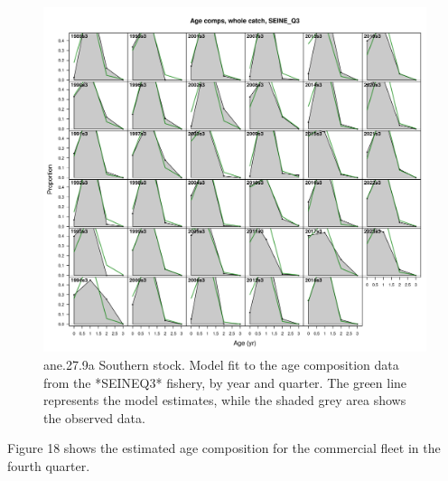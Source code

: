 \documentclass[
]{article}
\begin{document}
\begin{figure}[H]

{\centering \includegraphics[width=0.95\linewidth]{report/run/S1.0_4FLEETS_SelECO_RecIndex_Mnewfix/fig_age_fit_SeineQ3} 

}

\caption{ane.27.9a Southern stock. Model fit to the age composition data from the *SEINEQ3* fishery, by year and quarter. The green line represents the model estimates, while the shaded grey area shows the observed data.}\label{fig:unnamed-chunk-21}
\end{figure}

Figure 18 shows the estimated age composition for the commercial fleet
in the fourth quarter.
\end{document}
